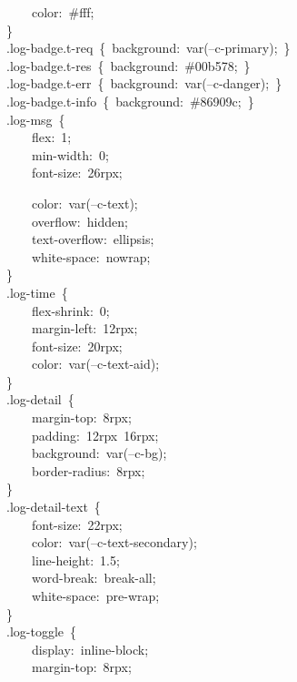 \documentclass[a4paper,10pt]{article}
\begin{document}
{~~~~~~~~color:~\#fff;\\
~~~~\}\\
~~~~.log-badge.t-req~\{~background:~var(--c-primary);~\}\\
~~~~.log-badge.t-res~\{~background:~\#00b578;~\}\\
~~~~.log-badge.t-err~\{~background:~var(--c-danger);~\}\\
~~~~.log-badge.t-info~\{~background:~\#86909c;~\}\\
~~~~.log-msg~\{\\
~~~~~~~~flex:~1;\\
~~~~~~~~min-width:~0;\\
~~~~~~~~font-size:~26rpx;
}

\newpage

{\ttfamily\footnotesize\raggedright
~~~~~~~~color:~var(--c-text);\\
~~~~~~~~overflow:~hidden;\\
~~~~~~~~text-overflow:~ellipsis;\\
~~~~~~~~white-space:~nowrap;\\
~~~~\}\\
~~~~.log-time~\{\\
~~~~~~~~flex-shrink:~0;\\
~~~~~~~~margin-left:~12rpx;\\
~~~~~~~~font-size:~20rpx;\\
~~~~~~~~color:~var(--c-text-aid);\\
~~~~\}\\
~~~~.log-detail~\{\\
~~~~~~~~margin-top:~8rpx;\\
~~~~~~~~padding:~12rpx~16rpx;\\
~~~~~~~~background:~var(--c-bg);\\
~~~~~~~~border-radius:~8rpx;\\
~~~~\}\\
~~~~.log-detail-text~\{\\
~~~~~~~~font-size:~22rpx;\\
~~~~~~~~color:~var(--c-text-secondary);\\
~~~~~~~~line-height:~1.5;\\
~~~~~~~~word-break:~break-all;\\
~~~~~~~~white-space:~pre-wrap;\\
~~~~\}\\
~~~~.log-toggle~\{\\
~~~~~~~~display:~inline-block;\\
~~~~~~~~margin-top:~8rpx;\\
}
\end{document}
